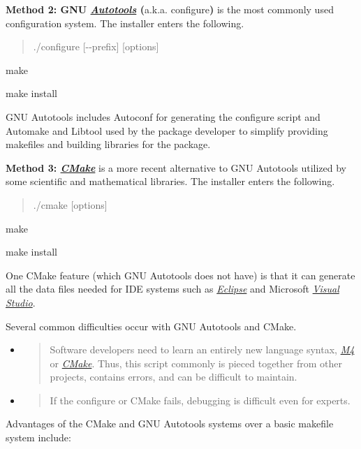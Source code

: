 \documentclass[]{article}
\begin{document}
\textbf{Method 2: GNU
\href{https://en.wikipedia.org/wiki/GNU_build_system}{\emph{Autotools}}
(}a.k.a. configure\textbf{)} is the most commonly used configuration
system. The installer enters the following.

\begin{quote}
./configure {[}-\/-prefix{]} {[}options{]}
\end{quote}

make

make install

GNU Autotools includes Autoconf for generating the configure script and
Automake and Libtool used by the package developer to simplify providing
makefiles and building libraries for the package.

\textbf{Method 3: \href{http://cmake.org}{\emph{CMake}}} is a more
recent alternative to GNU Autotools utilized by some scientific and
mathematical libraries. The installer enters the following.

\begin{quote}
./cmake {[}options{]}
\end{quote}

make

make install

One CMake feature (which GNU Autotools does not have) is that it can
generate all the data files needed for IDE systems such as
\href{http://eclipse}{\emph{Eclipse}} and Microsoft
\href{https://www.visualstudio.com/}{\emph{Visual Studio}}.

Several common difficulties occur with GNU Autotools and CMake.

\begin{itemize}
\item
  \begin{quote}
  Software developers need to learn an entirely new language syntax,
  \href{http://pubs.opengroup.org/onlinepubs/9699919799/utilities/m4.html}{\emph{M4}}
  or
  \href{https://cmake.org/cmake/help/v3.0/manual/cmake-language.7.html\#syntax}{\emph{CMake}}.
  Thus, this script commonly is pieced together from other projects,
  contains errors, and can be difficult to maintain.
  \end{quote}
\item
  \begin{quote}
  If the configure or CMake fails, debugging is difficult even for
  experts.
  \end{quote}
\end{itemize}

Advantages of the CMake and GNU Autotools systems over a basic makefile
system include:
\end{document}
